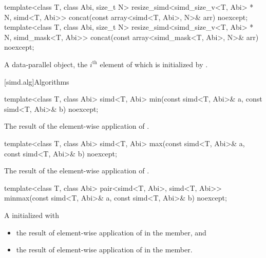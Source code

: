 \begin{itemdecl}
  template<class T, class Abi, size_t N>
    resize_simd<simd_size_v<T, Abi> * N, simd<T, Abi>>
      concat(const array<simd<T, Abi>, N>& arr) noexcept;
  template<class T, class Abi, size_t N>
    resize_simd<simd_size_v<T, Abi> * N, simd_mask<T, Abi>>
      concat(const array<simd_mask<T, Abi>, N>& arr) noexcept;
\end{itemdecl}

\begin{itemdescr}
  \pnum\returns
  A data-parallel object, the $i^\text{th}$ element of which is initialized by .
\end{itemdescr}

[simd.alg]{Algorithms}

\begin{itemdecl}
template<class T, class Abi> simd<T, Abi> min(const simd<T, Abi>& a, const simd<T, Abi>& b) noexcept;
\end{itemdecl}

\begin{itemdescr}
  \pnum\returns
  The result of the element-wise application of  \foralli.
\end{itemdescr}

\begin{itemdecl}
template<class T, class Abi> simd<T, Abi> max(const simd<T, Abi>& a, const simd<T, Abi>& b) noexcept;
\end{itemdecl}

\begin{itemdescr}
  \pnum\returns
  The result of the element-wise application of  \foralli.
\end{itemdescr}

\begin{itemdecl}
template<class T, class Abi>
  pair<simd<T, Abi>, simd<T, Abi>> minmax(const simd<T, Abi>& a, const simd<T, Abi>& b) noexcept;
\end{itemdecl}

\begin{itemdescr}
  \pnum\returns
  A  initialized with
  \begin{itemize}
    \item the result of element-wise application of  \foralli{} in the  member, and
    \item the result of element-wise application of  \foralli{} in the  member.
  \end{itemize}
\end{itemdescr}

